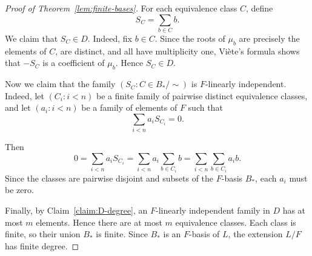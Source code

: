 \begin{proof}[Proof of Theorem~\ref{lem:finite-bases}]
For each equivalence class $C$, define
\[
 S_C=\sum_{b\in C}b.
\]
We claim that $S_C\in D$. Indeed, fix $b\in C$.
Since the roots of $\mu_b$ are precisely the elements of $C$, are
distinct, and all have multiplicity one, Vi\`ete's formula shows that
$-S_C$ is a coefficient of $\mu_b$.
Hence $S_C\in D$.

Now we claim that the family $(S_C: C \in B_*/\sim)$ is
$F$-linearly independent.
Indeed, let $(C_i: i<n)$ be a finite family of pairwise distinct equivalence classes, and let $(a_i: i<n)$ be a family of elements of $F$ such that
\[
 \sum_{i< n} a_i S_{C_i}=0.
\]

Then
\[
 0=\sum_{i<n} a_i S_{C_i}
  =\sum_{i<n} a_i\sum_{b\in C_i}b
  =\sum_{i< n}\sum_{b\in C_i}a_ib.
\]
Since the classes are pairwise disjoint and subsets of the $F$-basis $B_*$, each $a_i$ must be zero.

Finally, by Claim~\ref{claim:D-degree}, an $F$-linearly independent family in
$D$ has at most $m$ elements. Hence there are at most $m$ equivalence
classes. Each class is finite, so their union $B_*$ is finite. Since
$B_*$ is an $F$-basis of $L$, the extension $L/F$ has finite degree.
\end{proof}
